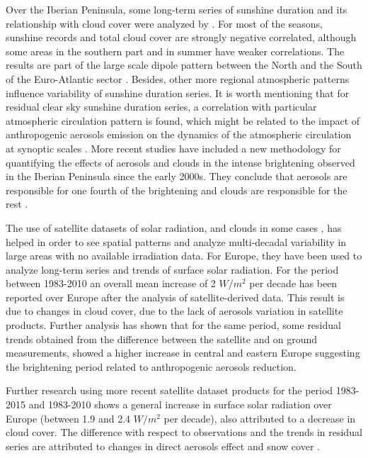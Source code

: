 
Over the Iberian Peninsula, some long-term series of sunshine duration and its relationship with cloud cover were analyzed by \cite*{Sanchez-Lorenzo2009}. For most of the seasons, sunshine records and total cloud cover are strongly negative correlated, although some areas in the southern part and in summer have weaker correlations. The results are part of the large scale dipole pattern between the North and the South of the Euro-Atlantic sector \cite*{Pozo-Vazquez2004}. Besides, other more regional atmospheric patterns influence variability of sunshine duration series. It is worth mentioning that for residual clear sky sunshine duration series, a correlation with particular atmospheric circulation pattern is found, which might be related to the impact of anthropogenic aerosols emission on the dynamics of the atmospheric circulation at synoptic scales \cite{Sanchez-Lorenzo2009}. More recent studies have included a new methodology for quantifying the effects of aerosols and clouds in the intense brightening observed in the Iberian Peninsula since the early 2000s. They conclude that aerosols are responsible for one fourth of the brightening and clouds are responsible for the rest \cite*{Mateos2014}. %

The use of satellite datasets of solar radiation, and clouds in some cases \cite*{Pfeifroth2017}, has helped in order to see spatial patterns and analyze multi-decadal variability in large areas with no available irradiation data. For Europe, they have been used to analyze long-term series and trends of surface solar radiation. For the period between 1983-2010 an overall mean increase of 2 $W/m^2$ per decade has been reported over Europe after the analysis of satellite-derived data. This result is due to changes in cloud cover, due to the lack of aerosols variation in satellite products. Further analysis has shown that for the same period, some residual trends obtained from the difference between the satellite and on ground measurements, showed a higher increase in central and eastern Europe suggesting the brightening period related to anthropogenic aerosols reduction.

Further research using more recent satellite dataset products for the period 1983-2015 and 1983-2010 shows a general increase in surface solar radiation over Europe (between 1.9 and 2.4 $W/m^2$ per decade), also attributed to a decrease in cloud cover. The difference with respect to observations and the trends in residual series are attributed to changes in direct aerosols effect and snow cover \cite*{Pfeifroth2018, Sanchez-Lorenzo2017}. 


